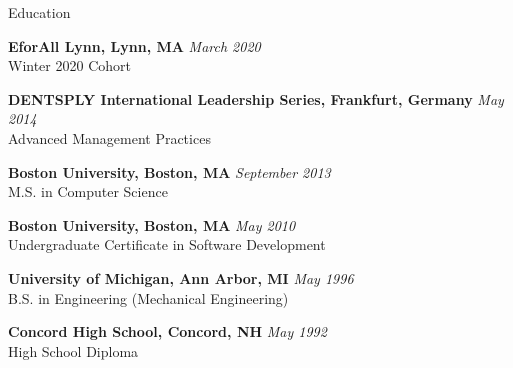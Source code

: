 \documentclass{resume}
\begin{document}
\begin{rSection}{Education}

\item {\bf EforAll Lynn, Lynn, MA} \hfill {\em March 2020} \\
Winter 2020 Cohort

\item {\bf DENTSPLY International Leadership Series, Frankfurt, Germany} \hfill {\em May 2014} \\
Advanced Management Practices

\item {\bf Boston University, Boston, MA} \hfill {\em September 2013} \\
M.S. in Computer Science

\item {\bf Boston University, Boston, MA} \hfill {\em May 2010} \\
Undergraduate Certificate in Software Development

\item {\bf University of Michigan, Ann Arbor, MI} \hfill {\em May 1996} \\
B.S. in Engineering (Mechanical Engineering)

\item {\bf Concord High School, Concord, NH} \hfill {\em May 1992} \\
High School Diploma

\end{rSection}
\end{document}
